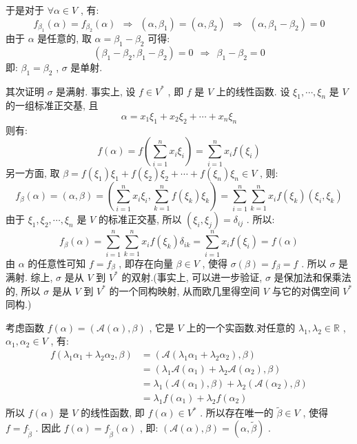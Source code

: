 \documentclass[11pt,a4paper,openany,oneside]{book}
\begin{document}
于是对于 $ \forall \alpha \in V $ , 有:
 $$  f_{\beta_1}(\alpha) = f_{\beta_2}(\alpha) \ \ \Rightarrow \ \ (\alpha, \beta_1) = (\alpha, \beta_2) \ \ \Rightarrow \ \ (\alpha, \beta_1-\beta_2) = 0  $$ 
由于 $ \alpha $ 是任意的, 取 $ \alpha=\beta_1-\beta_2 $ 可得:
 $$  (\beta_1-\beta_2, \beta_1-\beta_2)=0 \ \ \Rightarrow \ \ \beta_1 - \beta_2 = 0  $$ 
即: $ \beta_1 = \beta_2 $ ,  $ \sigma $ 是单射. 

其次证明 $ \sigma $ 是满射. 事实上, 设 $ f \in V^* $ , 即 $ f $ 是 $ V $ 上的线性函数. 设 $ \xi_1, \cdots, \xi_n $ 是 $ V $ 的一组标准正交基, 且
 $$  \alpha = x_1\xi_1 + x_2\xi_2 + \cdots + x_n\xi_n  $$ 
则有:
 $$  f(\alpha) = f(\sum\limits_{i=1}^n x_i\xi_i) = \sum\limits_{i=1}^n x_if(\xi_i)  $$ 
另一方面, 取 $ \beta = f(\xi_1)\xi_1 + f(\xi_2)\xi_2 + \cdots + f(\xi_n)\xi_n \in V $ , 则:
 $$  f_{\beta}(\alpha) = (\alpha, \beta) = (\sum\limits_{i=1}^nx_i\xi_i, \sum\limits_{k=1}^nf(\xi_k)\xi_k)=\sum\limits_{i=1}^n\sum\limits_{k=1}^n x_if(\xi_k)(\xi_i, \xi_k)  $$ 
由于 $ \xi_1, \xi_2, \cdots, \xi_n $ 是 $ V $ 的标准正交基, 所以 $ (\xi_i, \xi_j) = \delta_{ij} $ . 所以:
 $$  f_{\beta}(\alpha) = \sum\limits_{i=1}^n\sum\limits_{k=1}^n x_if(\xi_k)\delta_{ik} = \sum\limits_{i=1}^nx_if(\xi_i) = f(\alpha)  $$ 
由 $ \alpha $ 的任意性可知 $ f = f_{\beta} $ , 即存在向量 $ \beta \in V $ , 使得 $ \sigma(\beta) = f_{\beta}=f $ . 所以 $ \sigma $ 是满射.
综上,  $ \sigma $ 是从 $ V $ 到 $ V^* $ 的双射.(事实上, 可以进一步验证,  $ \sigma $ 是保加法和保乘法的, 所以 $ \sigma $ 是从 $ V $ 到 $ V^* $ 的一个同构映射, 从而欧几里得空间 $ V $ 与它的对偶空间 $ V^* $ 同构.)

考虑函数 $ f(\alpha) = (\mathcal{A}(\alpha), \beta) $ , 它是 $ V $ 上的一个实函数.对任意的 $ \lambda_1, \lambda_2 \in \mathbb{R} $ ,  $ \alpha_1, \alpha_2 \in V $ , 有:
\begin{align*}
f(\lambda_1\alpha_1+\lambda_2\alpha_2, \beta) &= (\mathcal{A}(\lambda_1\alpha_1 + \lambda_2\alpha_2), \beta) \\
&=(\lambda_1\mathcal{A}(\alpha_1) + \lambda_2\mathcal{A}(\alpha_2), \beta)  \\
&=\lambda_1(\mathcal{A}(\alpha_1), \beta) + \lambda_2(\mathcal{A}(\alpha_2), \beta) \\
&=\lambda_1f(\alpha_1) + \lambda_2f(\alpha_2)
\end{align*}
所以 $ f(\alpha) $ 是 $ V $ 的线性函数, 即 $ f(\alpha) \in V^* $ . 所以存在唯一的 $ \widetilde{\beta} \in V $ , 使得 $ f=f_{\widetilde{\beta}} $ . 因此 $ f(\alpha) = f_{\widetilde{\beta}}(\alpha) $ , 即: $ (\mathcal{A}(\alpha), \beta) = (\alpha, \widetilde{\beta}) $ . \\
\end{document}
